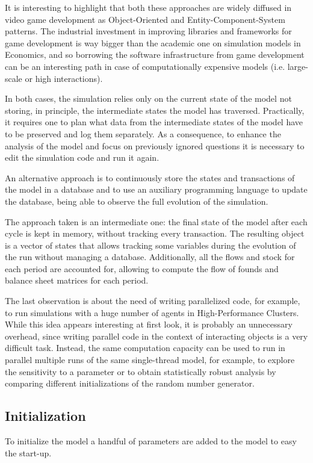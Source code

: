 \documentclass[a4paper, headings=standardclasses]{scrartcl}
\numberwithin{equation}{subsection}
\begin{document}
It is interesting to highlight that both these approaches are widely diffused in video game development as Object-Oriented and Entity-Component-System patterns. The industrial investment in improving libraries and frameworks for game development is way bigger than the academic one on simulation models in Economics, and so borrowing the software infrastructure from game development can be an interesting path in case of computationally expensive models (i.e. large-scale or high interactions).

In both cases, the simulation relies only on the current state of the model not storing, in principle, the intermediate states the model has traversed. Practically, it requires one to plan what data from the intermediate states of the model have to be preserved and log them separately. As a consequence, to enhance the analysis of the model and focus on previously ignored questions it is necessary to edit the simulation code and run it again.

An alternative approach is to continuously store the states and transactions of the model in a database and to use an auxiliary programming language to update the database, being able to observe the full evolution of the simulation.

The approach taken is an intermediate one: the final state of the model after each cycle is kept in memory, without tracking every transaction.
The resulting object is a vector of states that allows tracking some variables during the evolution of the run without managing a database. Additionally, all the flows and stock for each period are accounted for, allowing to compute the flow of founds and balance sheet matrices for each period.

The last observation is about the need of writing parallelized code, for example, to run simulations with a huge number of agents in High-Performance Clusters. While this idea appears interesting at first look, it is probably an unnecessary overhead, since writing parallel code in the context of interacting objects is a very difficult task.
Instead, the same computation capacity can be used to run in parallel multiple runs of the same single-thread model, for example, to explore the sensitivity to a parameter or to obtain statistically robust analysis by comparing different initializations of the random number generator.

\subsection{Initialization}
To initialize the model a handful of parameters are added to the model to easy the start-up.
\end{document}
